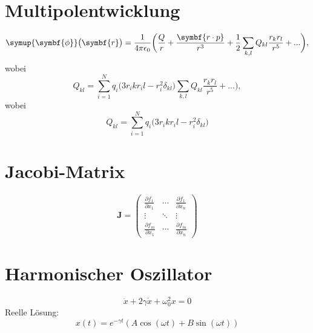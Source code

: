 \documentclass{scrartcl}
\newcommand{\be}{\begin{equation}} %
\newcommand{\ee}{\end{equation}} %
\begin{document}
\section{Multipolentwicklung}
\be
\symup{\symbf{\phi}}\bigl(\symbf{r}\bigr)=\frac{1}{4\pi\epsilon_0}
\biggl(\frac{Q}{r}+\frac{\symbf{r\cdot p}}{r^3}+\frac{1}{2}
\sum_{k,l}Q_{kl}\frac{r_k r_l}{r^5}+...\biggr) \label{eqn:19},
\ee
wobei
\begin{equation*} %
  Q_{k l}=
  \sum_{i=1}^N %
  q_i\bigl(3r_i k r_i l -r^2_i \delta_{kl} \bigr)
\sum_{k,l}Q_{k l} \frac{r_k r_l}{r^5}+...\biggr) \label{eqn:19},
\end{equation*}
wobei
\begin{equation*} %
  Q_{k l}=
  \sum_{i=1}^N %
   q_i \bigl(3r_ik r_il -r^2_i \delta_{kl} \bigr)%
\end{equation*}
\section{Jacobi-Matrix}
\begin{equation}
  \symbf{J}=
  \begin{pmatrix}
    \frac{\partial f_1}{\partial x_1} & \cdots & \frac{\partial f_1}{\partial x_n}
    \\ %
    \vdots & %
    \ddots & %
    \vdots \\
    \frac{\partial f_m}{\partial x_1} & \cdots %
    & \frac{\partial f_m}{\partial x_n}
  \end{pmatrix}
\end{equation}
\newpage
\section{Harmonischer Oszillator}
\begin{equation}
  \ddot{x}+2\gamma\dot{x}+\omega_0^2 x=0 \label{eqn:osz}
\end{equation}
Reelle Lösung:
\be
x(t)=e^{-\gamma t} (A\cos(\omega t)+B\sin(\omega t))
\label{eqn:reel}
\ee
\end{document}
